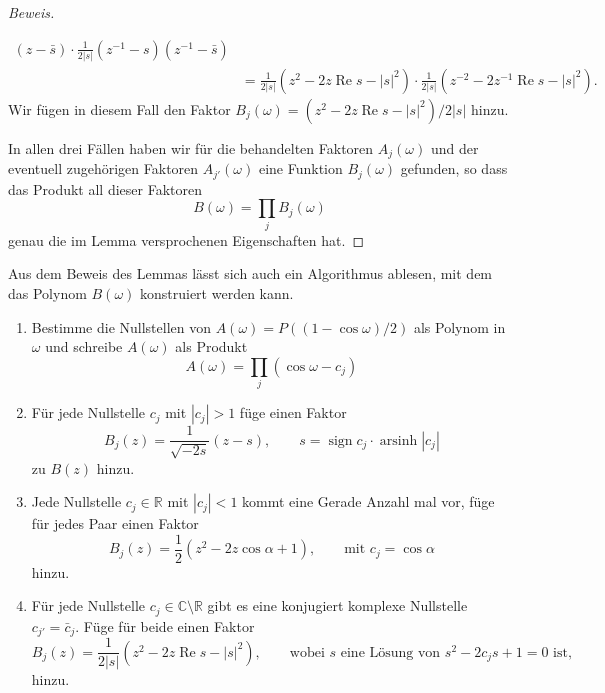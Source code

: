 \begin{proof}[Beweis]
\begin{enumerate}
\begin{align*}
(z-\bar{s})
\cdot
\frac1{2|s|}
(z^{-1}-s)
(z^{-1}-\bar{s})
\\
&=
\frac1{2|s|}(z^2-2z\operatorname{Re}s -|s|^2)
\cdot
\frac1{2|s|}(z^{-2}-2z^{-1}\operatorname{Re}s -|s|^2).
\end{align*}
Wir fügen in diesem Fall den Faktor $B_j(\omega)=(z^2-2z\operatorname{Re}s-|s|^2)/2|s|$ hinzu.
\end{enumerate}
In allen drei Fällen haben wir für die behandelten Faktoren $A_j(\omega)$
und der eventuell zugehörigen Faktoren $A_{j'}(\omega)$ eine Funktion
$B_j(\omega)$ gefunden, so dass das Produkt all dieser Faktoren
\[
B(\omega) = \prod_j B_j(\omega)
\]
genau die im Lemma versprochenen Eigenschaften hat.
\end{proof}

Aus dem Beweis des Lemmas lässt sich auch ein Algorithmus ablesen, mit
dem das Polynom $B(\omega)$ konstruiert werden kann.
\begin{enumerate}
\item
Bestimme die Nullstellen von $A(\omega) = P((1-\cos \omega)/2)$ 
als Polynom in $\omega$ und schreibe $A(\omega)$ als Produkt
\[
A(\omega) = \prod_j (\cos\omega - c_j)
\]
\item Für jede Nullstelle $c_j$ mit $|c_j|>1$ füge einen Faktor 
\[
B_j(z)=\frac{1}{\sqrt{-2s}}(z-s),\qquad s = \operatorname{sign}c_j\cdot \operatorname{arsinh}|c_j|
\]
zu $B(z)$ hinzu.
\item
Jede Nullstelle $c_j \in\mathbb R$ mit $|c_j|<1$ kommt eine Gerade Anzahl mal
vor, füge für jedes Paar einen Faktor
\[
B_j(z) = \frac12(z^2 -2 z\cos \alpha +1),
\qquad\text{mit $c_j=\cos\alpha$}
\]
hinzu.
\item
Für jede Nullstelle $c_j\in \mathbb C\setminus\mathbb R$ gibt es
eine konjugiert komplexe Nullstelle $c_{j'}=\bar{c}_j$.
Füge für beide einen Faktor
\[
B_j(z) = \frac{1}{2|s|}(z^2 -2z\operatorname{Re}s-|s|^2),
\qquad
\text{wobei $s$ eine Lösung von $s^2 -2c_js+1=0$ ist,}
\]
hinzu.
\end{enumerate}

